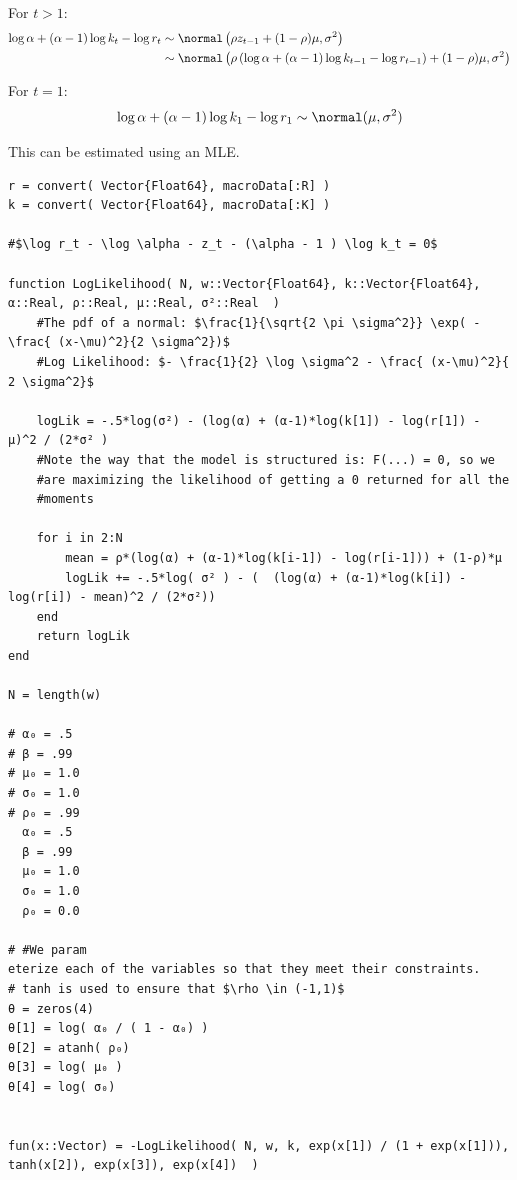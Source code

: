 \documentclass[12pt, letterpaper]{paper}
\begin{document}
For $t > 1$:
\begin{align*}
  \log \alpha + (\alpha-1) \log k_t - \log r_t &\sim \normal\left( \rho z_{t-1} +
                                       (1-\rho)\mu, \sigma^2 \right)\\
  &\sim \normal\left( \rho\left( \log \alpha + (\alpha-1)\log k_{t-1} - \log r_{t-1}
    \right) + (1-\rho)\mu, \sigma^2 \right)
\end{align*}

For $t = 1$:
\begin{equation*}
  \log \alpha + (\alpha-1)\log k_1 - \log r_1 \sim \normal( \mu, \sigma^2)
\end{equation*}

This can be estimated using an MLE.

\begin{verbatim}
r = convert( Vector{Float64}, macroData[:R] )
k = convert( Vector{Float64}, macroData[:K] )

#$\log r_t - \log \alpha - z_t - (\alpha - 1 ) \log k_t = 0$

function LogLikelihood( N, w::Vector{Float64}, k::Vector{Float64}, α::Real, ρ::Real, μ::Real, σ²::Real  )
    #The pdf of a normal: $\frac{1}{\sqrt{2 \pi \sigma^2}} \exp( - \frac{ (x-\mu)^2}{2 \sigma^2})$
    #Log Likelihood: $- \frac{1}{2} \log \sigma^2 - \frac{ (x-\mu)^2}{ 2 \sigma^2}$

    logLik = -.5*log(σ²) - (log(α) + (α-1)*log(k[1]) - log(r[1]) - μ)^2 / (2*σ² )
    #Note the way that the model is structured is: F(...) = 0, so we
    #are maximizing the likelihood of getting a 0 returned for all the
    #moments

    for i in 2:N
        mean = ρ*(log(α) + (α-1)*log(k[i-1]) - log(r[i-1])) + (1-ρ)*μ
        logLik += -.5*log( σ² ) - (  (log(α) + (α-1)*log(k[i]) - log(r[i]) - mean)^2 / (2*σ²))
    end
    return logLik
end

N = length(w)

# α₀ = .5
# β = .99
# μ₀ = 1.0
# σ₀ = 1.0
# ρ₀ = .99
  α₀ = .5
  β = .99
  μ₀ = 1.0
  σ₀ = 1.0
  ρ₀ = 0.0

# #We param
eterize each of the variables so that they meet their constraints.
# tanh is used to ensure that $\rho \in (-1,1)$
θ = zeros(4)
θ[1] = log( α₀ / ( 1 - α₀) )
θ[2] = atanh( ρ₀)
θ[3] = log( μ₀ )
θ[4] = log( σ₀)


fun(x::Vector) = -LogLikelihood( N, w, k, exp(x[1]) / (1 + exp(x[1])), tanh(x[2]), exp(x[3]), exp(x[4])  )


\end{verbatim}
\end{document}
